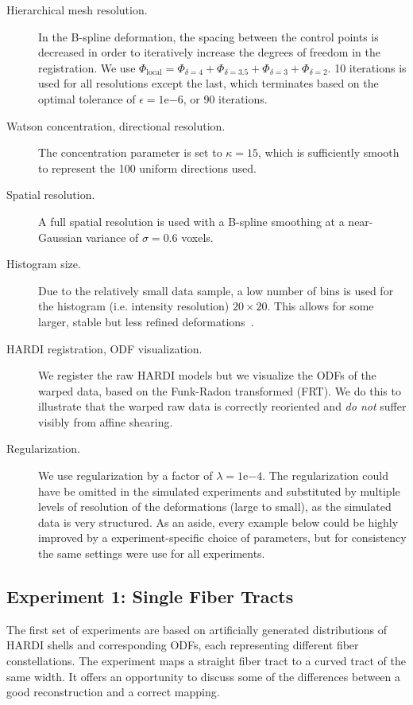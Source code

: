 \documentclass[twocolumn]{svjour3}
\begin{document}
\begin{description}
\item[Hierarchical mesh resolution.] In the B-spline deformation, the spacing between the
  control points is decreased in order to iteratively increase the degrees of freedom in
  the registration. We use
  $\Phi_{\text{local}} = \Phi_{\delta=4} + \Phi_{\delta=3.5} + \Phi_{\delta=3} +
  \Phi_{\delta=2}$.  10 iterations is used for all resolutions except the last, which
  terminates based on the optimal tolerance of $\epsilon = 1\mathrm{e}{-6}$, or 90
  iterations.
\item[Watson concentration, directional resolution.] The concentration parameter is set to
  $\kappa=15$, which is sufficiently smooth to represent the 100 uniform directions used.
\item[Spatial resolution.] A full spatial resolution is used with a B-spline smoothing at
  a near-Gaussian variance of $\sigma=0.6$ voxels.
\item[Histogram size.] Due to the relatively small data sample, a low number of bins is
  used for the histogram (i.e. intensity resolution) $20\times20$. This allows for some
  larger, stable but less refined deformations~\cite{darknersporring2012pami}.
\item[HARDI registration, ODF visualization.] We register the raw HARDI models but we
  visualize the ODFs of the warped data, based on the Funk-Radon transformed (FRT). We do
  this to illustrate that the warped raw data is correctly reoriented and \textit{do not}
  suffer visibly from affine shearing.
\item[Regularization.] We use regularization by a factor of $\lambda=1\mathrm{e}{-4}$. The
  regularization could have be omitted in the simulated experiments and substituted by
  multiple levels of resolution of the deformations (large to small), as the simulated
  data is very structured. As an aside, every example below could be highly improved by a
  experiment-specific choice of parameters, but for consistency the same settings were use
  for all experiments.
\end{description}

\subsection{Experiment 1: Single Fiber Tracts}
\label{subsec:singlefiber}
The first set of experiments are based on artificially generated distributions of HARDI
shells and corresponding ODFs, each representing different fiber constellations. The
experiment maps a straight fiber tract to a curved tract of the same width. It offers an
opportunity to discuss some of the differences between a good reconstruction and a correct
mapping.
\end{document}
